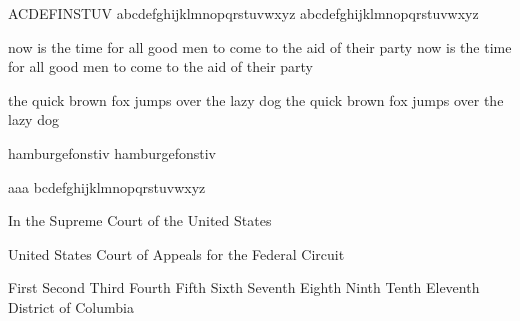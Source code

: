 \documentclass[12pt]{article}
\begin{document}
\Huge
ACDEFINSTUV
abcdefghijklmnopqrstuvwxyz
\textsf{abcdefghijklmnopqrstuvwxyz}

now is the time for all good men to come to the aid of their party
\textsf{now is the time for all good men to come to the aid of their party}

the quick brown fox jumps over the lazy dog
\textsf{the quick brown fox jumps over the lazy dog}

hamburgefonstiv
\textsf{hamburgefonstiv}

\def\doletter#1{\ifx#1\relax\else #1\textsf{#1} \expandafter\doletter\fi}

\doletter abcdefghijklmnopqrstuvwxyz\relax

In the Supreme Court of the United States

United States Court of Appeals for the Federal Circuit

First
Second
Third
Fourth
Fifth
Sixth
Seventh
Eighth
Ninth
Tenth
Eleventh
District of Columbia
\end{document}
